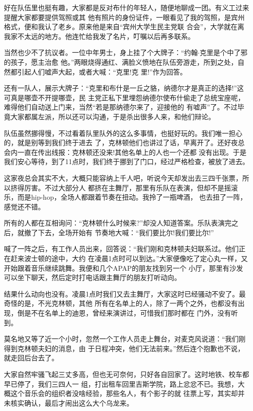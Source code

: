 ﻿\documentclass[11pt]{article}
\begin{document}
好在队伍里也挺有趣，大家都是反对布什的年轻人，随便地聊成一团。有义工过来提醒大家都要提供驾照或其
他有照片的身份证件，一眼看见了我的驾照，是宾州格式，便和我认了老乡。原来他是来自``宾州大学生民主党联
合会''，大学就在离我家不太远的地方。他连忙给我发了名片，叮嘱以后再多联系。

当然也少不了抗议者。一位中年男士，身上挂了个大牌子：``约翰$\cdot$克里是个中了邪的孩子，愿主治愈
他。''两眼烧得通红、满脸义愤地在队伍旁游走，所到之处，自然都引起人们嘘声大起，或者大喊：``克里!克
里!''作为回答。

还有一队人，展示大牌子：``克里和布什是一丘之貉，纳德尔才是真正的选择!''这可真是哪壶不开提哪壶，民
主党正私下里埋怨纳德尔使布什偷走了总统宝座呢，难得他们自动送上门来，当然``若是那纳德尔来了，迎接他的
有嘘声''了。不过毕竟大家都属左派，所以还可以沟通，于是杀出很多人来，和他们辩论。

队伍虽然挪得慢，不过看着队里队外的这么多事情，也挺好玩的。我们唯一担心的，就是别等到我们终于进去
了，克林顿他们也讲过了话，早离开了。还好夜总会内一直在传出线报：克林顿还没来!其他名单上的人也一个还都
没有出现。于是我们安心等待，到了11点时，我们终于挪到了门口，经过严格检查，被放了进去。

这家夜总会其实不大，大概只能容纳上千人吧，听说今天却发出去三四千张票，所以挤得厉害。不过大部分人
都挤在主舞厅，那里有乐队在表演，但却不是摇滚乐，而是hip-hop，全场人都跟着节奏在扭动。我拎了一瓶啤酒，
也去扭了一阵，感觉还不错。

所有的人都在互相询问：``克林顿什么时候来?''却没人知道答案。乐队表演完之后，就撤了下去，全场开始有
节奏地大喊：``我们要比尔!我们要比尔!''

喊了一阵之后，有工作人员出来，回答说：``我们刚和克林顿夫妇联系过。他们正在赶来波士顿的途中，大约
在凌晨1点时可以到达。''大家便像吃了定心丸一样，又开始跟着音乐继续跳舞。我便和几个APAP的朋友找到另一个
小厅，那里有沙发可以坐下聊天，然后定时打电话跟主舞厅的朋友打听动向。

结果什么动向也没有。凌晨1点时我们又去主舞厅，大家这时已经骚动不安了。最奇怪的是，不光克林顿，其他
所有在名单上的人，除了一两个之外，也都没有出现，倒是不在名单上的迪恩，曾经来演讲过，可惜我们那时都在
门外，没有听到。

莫名地又等了近一个小时，忽然一个工作人员走上舞台，对麦克风说道：``我们刚得到克林顿夫妇的消息，由
于日程冲突，他们无法前来。''然后连个抱歉也不说，就走回后台去了。

大家自然牢骚飞起三丈多高，但也无可奈何，只好各自回家了。这时地铁、校车都早已停了，我们三四人一
组，打出租车回里吉斯学院，路上忿忿不已。我想，大概这个音乐会的组织者没啥经验，那些名人，有个影子的就
往票上写，其实却并未核实确认，最后才闹出这么大个乌龙来。
\end{document}
